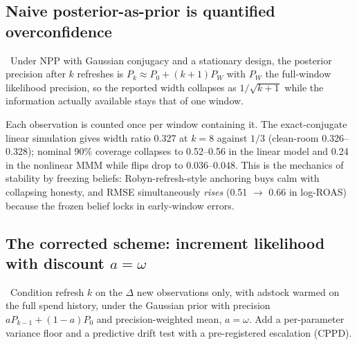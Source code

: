 \subsection{Naive posterior-as-prior is quantified overconfidence}

\begin{proposition}
\label{refresh:prop:npp}
\tagEstablished\ Under NPP with Gaussian conjugacy and a stationary design, the posterior precision after $k$ refreshes is $P_k \approx P_0 + (k+1)P_W$ with $P_W$ the full-window likelihood precision, so the reported width collapses as $1/\sqrt{k+1}$ while the information actually available stays that of one window.
\end{proposition}

Each observation is counted once per window containing it. The exact-conjugate linear simulation gives width ratio 0.327 at $k = 8$ against $1/3$ (clean-room 0.326--0.328); nominal 90\% coverage collapses to 0.52--0.56 in the linear model and 0.24 in the nonlinear MMM while flips drop to 0.036--0.048. This is the mechanics of stability by freezing beliefs: Robyn-refresh-style anchoring buys calm with collapsing honesty, and RMSE simultaneously \emph{rises} (0.51 $\to$ 0.66 in log-ROAS) because the frozen belief locks in early-window errors.

\subsection{The corrected scheme: increment likelihood with discount $a = \omega$}

\begin{construction}
\label{refresh:con:cpp}
\tagEstablished\ Condition refresh $k$ on the $\Delta$ new observations only, with adstock warmed on the full spend history, under the Gaussian prior with precision $aP_{k-1} + (1-a)P_0$ and precision-weighted mean, $a = \omega$. Add a per-parameter variance floor and a predictive drift test with a pre-registered escalation (CPPD).
\end{construction}

